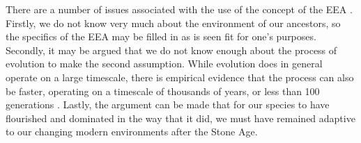 There are a number of issues associated with the use of the concept of the EEA \citep{LB02}. Firstly, we do not know very much about the environment of our ancestors, so the specifics of the EEA may be filled in as is seen fit for one's purposes. Secondly, it may be argued that we do not know enough about the process of evolution to make the second assumption. While evolution does in general operate on a large timescale, there is empirical evidence
that the process can also be faster, operating on a timescale of thousands of years, or less than 100 generations \citep[pp.~190--191 and references therein]{LB02}. Lastly, the argument can be made that for our species to have flourished and dominated in the way that it did, we must have remained adaptive to our changing modern environments after the Stone Age.

